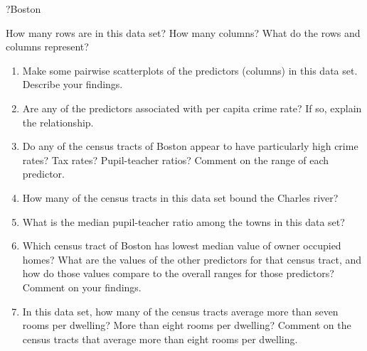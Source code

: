 \documentclass[
]{article}
\newenvironment{Shaded}{\begin{snugshade}}{\end{snugshade}}
\newcommand{\NormalTok}[1]{#1}
\begin{document}
\begin{Shaded}
\begin{Highlighting}[]
\NormalTok{?Boston}
\end{Highlighting}
\end{Shaded}

How many rows are in this data set? How many columns? What do the rows
and columns represent?

\begin{enumerate}
\def\labelenumi{(\alph{enumi})}
\setcounter{enumi}{1}
\item
  Make some pairwise scatterplots of the predictors (columns) in this
  data set. Describe your findings.
\item
  Are any of the predictors associated with per capita crime rate? If
  so, explain the relationship.
\item
  Do any of the census tracts of Boston appear to have particularly high
  crime rates? Tax rates? Pupil-teacher ratios? Comment on the range of
  each predictor.
\item
  How many of the census tracts in this data set bound the Charles
  river?
\item
  What is the median pupil-teacher ratio among the towns in this data
  set?
\item
  Which census tract of Boston has lowest median value of owner occupied
  homes? What are the values of the other predictors for that census
  tract, and how do those values compare to the overall ranges for those
  predictors? Comment on your findings.
\item
  In this data set, how many of the census tracts average more than
  seven rooms per dwelling? More than eight rooms per dwelling? Comment
  on the census tracts that average more than eight rooms per dwelling.
\end{enumerate}
\end{document}
